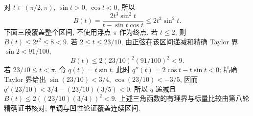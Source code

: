 对 $t\in(\pi/2,\pi)$, $\sin t>0$, $\cos t<0$, 所以
\[
 B(t)=\frac{2t^3\sin^2t}{t-\sin t\cos t}\le2t^2\sin^2t.
\]
下面三段覆盖整个区间, 不使用浮点 $\pi$ 作为终点.
若 $t\le2$, 则 $B(t)\le2t^2\le8<9$.
若 $2\le t\le23/10$, 由正弦在该区间递减和精确 Taylor 界 $\sin2<91/100$,
\[
 B(t)\le2(23/10)^2(91/100)^2<9.
\]
若 $23/10\le t<\pi$, 令 $q(t)=t\sin t$. 此时
$q''(t)=2\cos t-t\sin t<0$; 精确 Taylor 界给出
$\sin(23/10)<3/4$, $\cos(23/10)<-3/5$, 因而
$q'(23/10)<3/4-(23/10)(3/5)<0$.
所以 $q$ 递减且 $B(t)\le2((23/10)(3/4))^2<9$.
上述三角函数的有理界与标量比较由第八轮精确证书核对; 单调与凹性论证覆盖连续区间.

